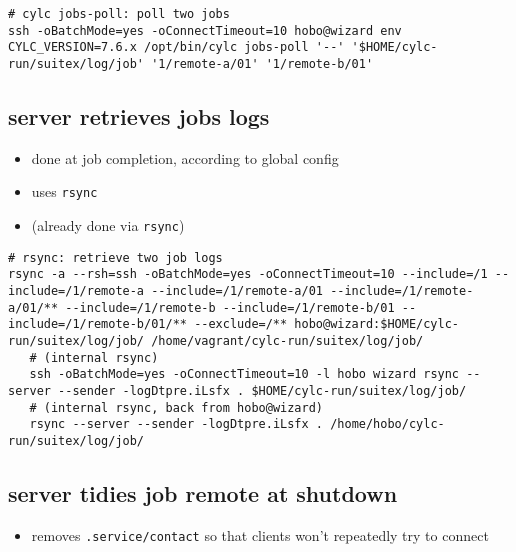 \documentclass{article}
\begin{document}
\vspace{5mm}
    \begin{lstlisting}
# cylc jobs-poll: poll two jobs
ssh -oBatchMode=yes -oConnectTimeout=10 hobo@wizard env CYLC_VERSION=7.6.x /opt/bin/cylc jobs-poll '--' '$HOME/cylc-run/suitex/log/job' '1/remote-a/01' '1/remote-b/01'
    \end{lstlisting}


\subsection{server retrieves jobs logs}

\begin{itemize}
  \item done at job completion, according to global config
  \item uses \lstinline=rsync=
\end{itemize}

{\color{blue}{\bf SSH-free?}
\begin{itemize}
  \item (already done via \lstinline=rsync=)
\end{itemize}
}

\vspace{5mm}
    \begin{lstlisting}
# rsync: retrieve two job logs
rsync -a --rsh=ssh -oBatchMode=yes -oConnectTimeout=10 --include=/1 --include=/1/remote-a --include=/1/remote-a/01 --include=/1/remote-a/01/** --include=/1/remote-b --include=/1/remote-b/01 --include=/1/remote-b/01/** --exclude=/** hobo@wizard:$HOME/cylc-run/suitex/log/job/ /home/vagrant/cylc-run/suitex/log/job/
   # (internal rsync)
   ssh -oBatchMode=yes -oConnectTimeout=10 -l hobo wizard rsync --server --sender -logDtpre.iLsfx . $HOME/cylc-run/suitex/log/job/
   # (internal rsync, back from hobo@wizard)
   rsync --server --sender -logDtpre.iLsfx . /home/hobo/cylc-run/suitex/log/job/
    \end{lstlisting}

\subsection{server tidies job remote at shutdown}

\begin{itemize}
  \item removes \lstinline=.service/contact= so that clients won't repeatedly
    try to connect
\end{itemize}
\end{document}
